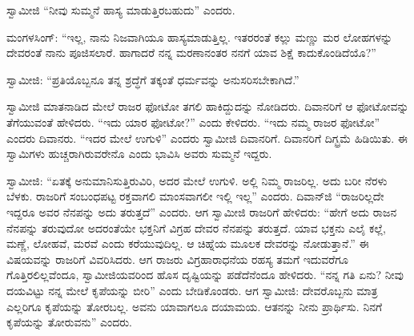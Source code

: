  ಸ್ವಾಮೀಜಿ “ನೀವು ಸುಮ್ಮನೆ ಹಾಸ್ಯ ಮಾಡುತ್ತಿರಬಹುದು” ಎಂದರು. 

 ಮಂಗಳಸಿಂಗ್: “ಇಲ್ಲ, ನಾನು ನಿಜವಾಗಿಯೂ ಹಾಸ್ಯಮಾಡುತ್ತಿಲ್ಲ. ಇತರರಂತೆ ಕಲ್ಲು ಮಣ್ಣು ಮರ ಲೋಹಗಳನ್ನು ದೇವರಂತೆ ನಾನು ಪೂಜಿಸಲಾರೆ. ಹಾಗಾದರೆ ನನ್ನ ಮರಣಾನಂತರ ನನಗೆ ಯಾವ ಶಿಕ್ಷೆ ಕಾದುಕೊಂಡಿದೆಯೊ?” 

 ಸ್ವಾಮೀಜಿ: “ಪ್ರತಿಯೊಬ್ಬನೂ ತನ್ನ ಶ್ರದ್ಧೆಗೆ ತಕ್ಕಂತೆ ಧರ್ಮವನ್ನು ಅನುಸರಿಸಬೇಕಾಗಿದೆ.” 

 ಸ್ವಾಮೀಜಿ ಮಾತನಾಡಿದ ಮೇಲೆ ರಾಜರ ಫೋಟೋ ತಗಲಿ ಹಾಕಿದ್ದುದನ್ನು ನೋಡಿದರು. ದಿವಾನರಿಗೆ ಆ ಫೋಟೋವನ್ನು ತೆಗೆಯುವಂತೆ ಹೇಳಿದರು. “ಇದು ಯಾರ ಫೋಟೋ?” ಎಂದು ಕೇಳಿದರು. “ಇದು ನಮ್ಮ ರಾಜರ ಫೋಟೋ” ಎಂದರು ದಿವಾನರು. “ಇದರ ಮೇಲೆ ಉಗುಳಿ” ಎಂದರು ಸ್ವಾಮೀಜಿ ದಿವಾನರಿಗೆ. ದಿವಾನರಿಗೆ ದಿಗ್ಭ್ರಮೆ ಹಿಡಿಯಿತು. ಈ ಸ್ವಾಮಿಗಳು ಹುಚ್ಚರಾಗಿರುವರೇನೊ ಎಂದು ಭಾವಿಸಿ ಅವರು ಸುಮ್ಮನೆ ಇದ್ದರು. 

 ಸ್ವಾಮೀಜಿ: “ಏತಕ್ಕೆ ಅನುಮಾನಿಸುತ್ತಿರುವಿರಿ, ಅದರ ಮೇಲೆ ಉಗುಳಿ. ಅಲ್ಲಿ ನಿಮ್ಮ ರಾಜರಿಲ್ಲ. ಅದು ಬರೀ ನೆರಳು ಬೆಳಕು. ರಾಜರಿಗೆ ಸಂಬಂಧಪಟ್ಟ ರಕ್ತವಾಗಲಿ ಮಾಂಸವಾಗಲೀ ಇಲ್ಲಿ ಇಲ್ಲ” ಎಂದರು. ದಿವಾನ್‍ಜಿ “ರಾಜರಿಲ್ಲದೇ ಇದ್ದರೂ ಅವರ ನೆನಪನ್ನು ಅದು ತರುತ್ತದೆ” ಎಂದರು. ಆಗ ಸ್ವಾಮೀಜಿ ರಾಜರಿಗೆ ಹೇಳಿದರು: “ಹೇಗೆ ಅದು ರಾಜನ ನೆನಪನ್ನು ತರುವುದೋ ಅದರಂತೆಯೇ ಭಕ್ತನಿಗೆ ವಿಗ್ರಹ ದೇವರ ನೆನಪನ್ನು ತರುತ್ತದೆ. ಯಾವ ಭಕ್ತನು ಎಲೈ ಕಲ್ಲೆ, ಮಣ್ಣೆ, ಲೋಹವೆ, ಮರವೆ ಎಂದು ಕರೆಯುವುದಿಲ್ಲ. ಆ ಚಿಹ್ನೆಯ ಮೂಲಕ ದೇವರನ್ನು ನೋಡುತ್ತಾನೆ.” ಈ ವಿಷಯವನ್ನು ರಾಜರಿಗೆ ವಿವರಿಸಿದರು. ಆಗ ರಾಜರು ವಿಗ್ರಹಾರಾಧನೆಯ ರಹಸ್ಯ ತಮಗೆ ಇದುವರೆಗೂ ಗೊತ್ತಿರಲಿಲ್ಲವೆಂದೂ, ಸ್ವಾಮೀಜಿಯವರಿಂದ ಹೊಸ ದೃಷ್ಟಿಯನ್ನು ಪಡೆದೆನೆಂದೂ ಹೇಳಿದರು. “ನನ್ನ ಗತಿ ಏನು? ನೀವು ದಯವಿಟ್ಟು ನನ್ನ ಮೇಲೆ ಕೃಪೆಯನ್ನು ಬೀರಿ” ಎಂದು ಬೇಡಿಕೊಂಡರು. ಆಗ ಸ್ವಾಮೀಜಿ: ದೇವರೊಬ್ಬನು ಮಾತ್ರ ಎಲ್ಲರಿಗೂ ಕೃಪೆಯನ್ನು ತೋರಬಲ್ಲ. ಅವನು ಯಾವಾಗಲೂ ದಯಾಮಯ. ಆತನನ್ನು ನೀನು ಪ್ರಾರ್ಥಿಸು. ನಿನಗೆ ಕೃಪೆಯನ್ನು ತೋರುವನು” ಎಂದರು. 

